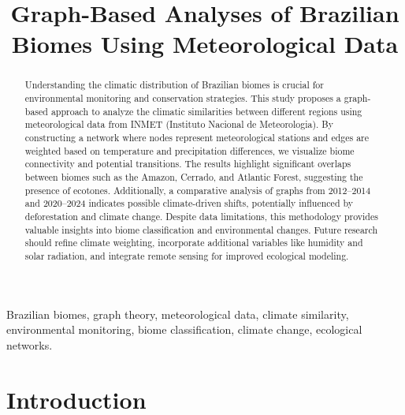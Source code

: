 \documentclass[conference]{IEEEtran}
\begin{document}
\title{\textbf{Graph-Based Analyses of Brazilian Biomes Using Meteorological Data}}

\author{
}

\maketitle

\begin{abstract}
Understanding the climatic distribution of Brazilian biomes is crucial for environmental monitoring and conservation strategies. This study proposes a graph-based approach to analyze the climatic similarities between different regions using meteorological data from INMET (Instituto Nacional de Meteorologia). By constructing a network where nodes represent meteorological stations and edges are weighted based on temperature and precipitation differences, we visualize biome connectivity and potential transitions. The results highlight significant overlaps between biomes such as the Amazon, Cerrado, and Atlantic Forest, suggesting the presence of ecotones. Additionally, a comparative analysis of graphs from 2012–2014 and 2020–2024 indicates possible climate-driven shifts, potentially influenced by deforestation and climate change. Despite data limitations, this methodology provides valuable insights into biome classification and environmental changes. Future research should refine climate weighting, incorporate additional variables like humidity and solar radiation, and integrate remote sensing for improved ecological modeling.
\end{abstract}

\begin{IEEEkeywords}
Brazilian biomes, graph theory, meteorological data, climate similarity, environmental monitoring, biome classification, climate change, ecological networks.
\end{IEEEkeywords}



\section{Introduction}
\end{document}
